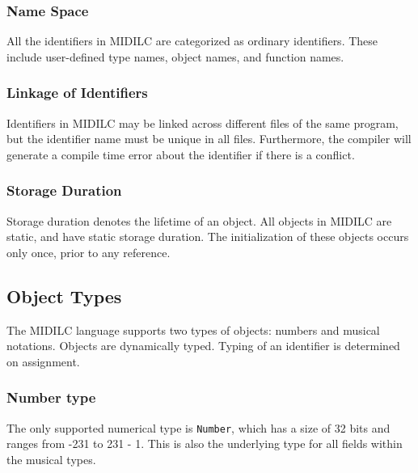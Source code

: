\documentclass[12pt,A4]{book}
\begin{document}
\subsubsection{Name Space}
All the identifiers in MIDILC are categorized as ordinary identifiers. These include user-defined type names, object names, and function names.
\subsubsection{Linkage of Identifiers}
Identifiers in MIDILC may be linked across different files of the same program, but the identifier name must be unique in all files. Furthermore, the compiler will generate a compile time error about the identifier if there is a conflict.
\subsubsection{Storage Duration}
Storage duration denotes the lifetime of an object. All objects in MIDILC are static, and have static storage duration. The initialization of these objects occurs only once, prior to any reference.
\subsection{Object Types}
The MIDILC language supports two types of objects: numbers and musical notations.  Objects are dynamically typed.  Typing of an identifier is determined on assignment.
\subsubsection{Number type}
The only supported numerical type is \verb|Number|, which has a size of 32 bits and ranges from -231 to 231 - 1.  This is also the underlying type for all fields within the musical types.
\end{document}
